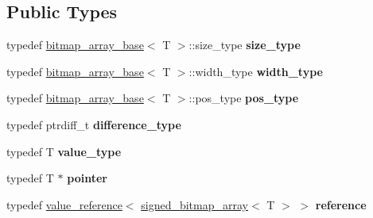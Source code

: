 \subsection*{Public Types}
\begin{DoxyCompactItemize}
\item 
\mbox{\label{classdialog_1_1signed__bitmap__array_a24345e1fc4edb3caa6cf70d64b8c1270}} 
typedef \hyperlink{classdialog_1_1bitmap__array__base}{bitmap\+\_\+array\+\_\+base}$<$ T $>$\+::size\+\_\+type {\bfseries size\+\_\+type}
\item 
\mbox{\label{classdialog_1_1signed__bitmap__array_a7dd28c394c7d4bc9df361821d3b8c28c}} 
typedef \hyperlink{classdialog_1_1bitmap__array__base}{bitmap\+\_\+array\+\_\+base}$<$ T $>$\+::width\+\_\+type {\bfseries width\+\_\+type}
\item 
\mbox{\label{classdialog_1_1signed__bitmap__array_a1a9389659f294a8004c013729cbd8da3}} 
typedef \hyperlink{classdialog_1_1bitmap__array__base}{bitmap\+\_\+array\+\_\+base}$<$ T $>$\+::pos\+\_\+type {\bfseries pos\+\_\+type}
\item 
\mbox{\label{classdialog_1_1signed__bitmap__array_aa236323ed2af148d9cfba379cdd4a4a7}} 
typedef ptrdiff\+\_\+t {\bfseries difference\+\_\+type}
\item 
\mbox{\label{classdialog_1_1signed__bitmap__array_aca75e58a25ad34a6d61b14df74654d78}} 
typedef T {\bfseries value\+\_\+type}
\item 
\mbox{\label{classdialog_1_1signed__bitmap__array_a49d0a2a82f2f07f9e622c3b3fdf2fb4b}} 
typedef T $\ast$ {\bfseries pointer}
\item 
\mbox{\label{classdialog_1_1signed__bitmap__array_a3da9f95f558c8c94967e2101597bb434}} 
typedef \hyperlink{classdialog_1_1value__reference}{value\+\_\+reference}$<$ \hyperlink{classdialog_1_1signed__bitmap__array}{signed\+\_\+bitmap\+\_\+array}$<$ T $>$ $>$ {\bfseries reference}
\item 
\mbox{\label{classdialog_1_1signed__bitmap__array_a26814c235c8b026c5ec797a0b427ee02}} 

\end{DoxyCompactItemize}
